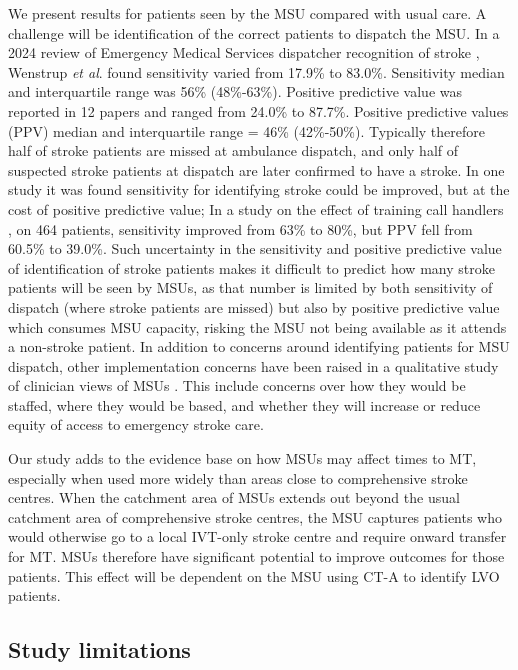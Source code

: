 We present results for patients seen by the MSU compared with usual care. A challenge will be identification of the correct patients to dispatch the MSU. In a 2024 review of Emergency Medical Services dispatcher recognition of stroke \cite{wenstrup_emergency_2024}, Wenstrup \textit{et al}. found sensitivity varied from 17.9\% to 83.0\%. Sensitivity median and interquartile range was 56\% (48\%-63\%). Positive predictive value was reported in 12 papers and ranged from 24.0\% to 87.7\%. Positive predictive values (PPV) median and interquartile range = 46\% (42\%-50\%). Typically therefore half of stroke patients are missed at ambulance dispatch, and only half of suspected stroke patients at dispatch are later confirmed to have a stroke. In one study it was found sensitivity for identifying stroke could be improved, but at the cost of positive predictive value; In a study on the effect of training call handlers \cite{watkins_training_2013}, on 464 patients, sensitivity improved from 63\% to 80\%, but PPV fell from 60.5\% to 39.0\%. Such uncertainty in the sensitivity and positive predictive value of identification of stroke patients makes it difficult to predict how many stroke patients will be seen by MSUs, as that number is limited by both sensitivity of dispatch (where stroke patients are missed) but also by positive predictive value which consumes MSU capacity, risking the MSU not being available as it attends a non-stroke patient. In addition to concerns around identifying patients for MSU dispatch, other implementation concerns have been raised in a qualitative study of clinician views of MSUs \cite{moseley_practitioner_2024}. This include concerns over how they would be staffed, where they would be based, and whether they will increase or reduce equity of access to emergency stroke care.

Our study adds to the evidence base on how MSUs may affect times to MT, especially when used more widely than areas close to comprehensive stroke centres. When the catchment area of MSUs extends out beyond the usual catchment area of comprehensive stroke centres, the MSU captures patients who would otherwise go to a local IVT-only stroke centre and require onward transfer for MT. MSUs therefore have significant potential to improve outcomes for those patients. This effect will be dependent on the MSU using CT-A to identify LVO patients.

\subsection{Study limitations}

